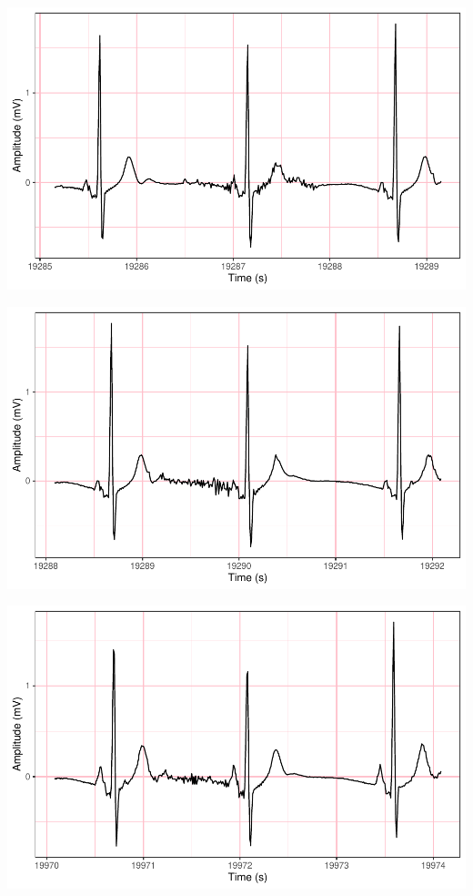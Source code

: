 \documentclass[
]{article}
\begin{document}
\begin{center}\includegraphics{report_files/figure-latex/abnormal-interval-36} \end{center}

\begin{center}\includegraphics{report_files/figure-latex/abnormal-interval-37} \end{center}

\begin{center}\includegraphics{report_files/figure-latex/abnormal-interval-38} \end{center}
\end{document}
